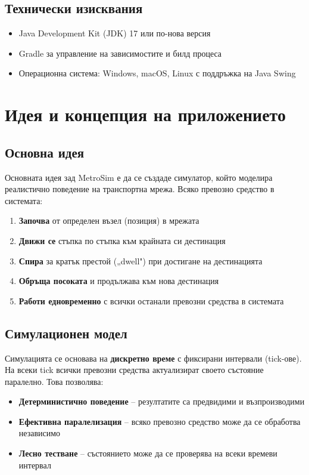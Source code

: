\documentclass{article}
\begin{document}
	\subsection{Технически изисквания}
	
	\begin{itemize}
		\item Java Development Kit (JDK) 17 или по-нова версия
		\item Gradle за управление на зависимостите и билд процеса
		\item Операционна система: Windows, macOS, Linux с поддръжка на Java Swing
	\end{itemize}
	
	\section{Идея и концепция на приложението}
	
	\subsection{Основна идея}
	
	Основната идея зад MetroSim е да се създаде симулатор, който моделира реалистично поведение на транспортна мрежа. Всяко превозно средство в системата:
	
	\begin{enumerate}
		\item \textbf{Започва} от определен възел (позиция) в мрежата
		\item \textbf{Движи се} стъпка по стъпка към крайната си дестинация
		\item \textbf{Спира} за кратък престой („dwell") при достигане на дестинацията
		\item \textbf{Обръща посоката} и продължава към нова дестинация
		\item \textbf{Работи едновременно} с всички останали превозни средства в системата
	\end{enumerate}
	
	\subsection{Симулационен модел}
	
	Симулацията се основава на \textbf{дискретно време} с фиксирани интервали (tick-ове). На всеки tick всички превозни средства актуализират своето състояние паралелно. Това позволява:
	
	\begin{itemize}
		\item \textbf{Детерминистично поведение} – резултатите са предвидими и възпроизводими
		\item \textbf{Ефективна паралелизация} – всяко превозно средство може да се обработва независимо
		\item \textbf{Лесно тестване} – състоянието може да се проверява на всеки времеви интервал
	\end{itemize}
	
\end{document}

